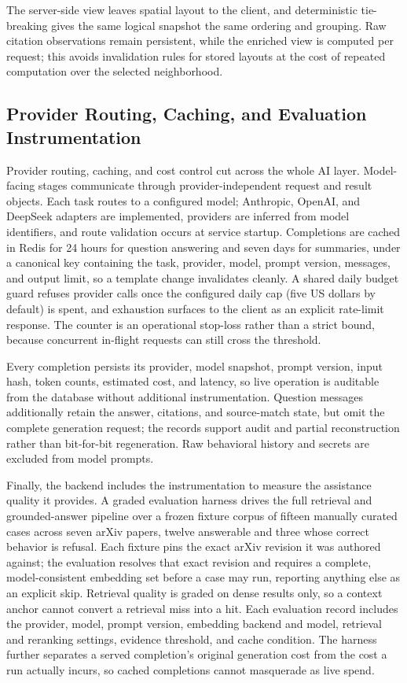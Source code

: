 The server-side view leaves spatial layout to the client, and deterministic tie-breaking gives the same logical snapshot the same ordering and grouping. Raw citation observations remain persistent, while the enriched view is computed per request; this avoids invalidation rules for stored layouts at the cost of repeated computation over the selected neighborhood.

\subsection{Provider Routing, Caching, and Evaluation Instrumentation}
\label{subsec:backend-provider}

Provider routing, caching, and cost control cut across the whole AI layer.
Model-facing stages communicate through provider-independent request and result objects. Each task routes to a configured model; Anthropic, OpenAI, and DeepSeek adapters are implemented, providers are inferred from model identifiers, and route validation occurs at service startup.
Completions are cached in Redis for 24 hours for question answering and seven days for summaries, under a canonical key containing the task, provider, model, prompt version, messages, and output limit, so a template change invalidates cleanly.
A shared daily budget guard refuses provider calls once the configured daily cap (five US dollars by default) is spent, and exhaustion surfaces to the client as an explicit rate-limit response. The counter is an operational stop-loss rather than a strict bound, because concurrent in-flight requests can still cross the threshold.

Every completion persists its provider, model snapshot, prompt version, input hash, token counts, estimated cost, and latency, so live operation is auditable from the database without additional instrumentation.
Question messages additionally retain the answer, citations, and source-match state, but omit the complete generation request; the records support audit and partial reconstruction rather than bit-for-bit regeneration.
Raw behavioral history and secrets are excluded from model prompts.

Finally, the backend includes the instrumentation to measure the assistance quality it provides.
A graded evaluation harness drives the full retrieval and grounded-answer pipeline over a frozen fixture corpus of fifteen manually curated cases across seven arXiv papers, twelve answerable and three whose correct behavior is refusal.
Each fixture pins the exact arXiv revision it was authored against; the evaluation resolves that exact revision and requires a complete, model-consistent embedding set before a case may run, reporting anything else as an explicit skip.
Retrieval quality is graded on dense results only, so a context anchor cannot convert a retrieval miss into a hit. Each evaluation record includes the provider, model, prompt version, embedding backend and model, retrieval and reranking settings, evidence threshold, and cache condition.
The harness further separates a served completion's original generation cost from the cost a run actually incurs, so cached completions cannot masquerade as live spend.

